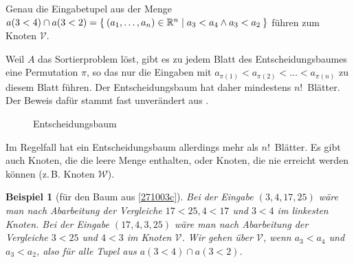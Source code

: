 \documentclass[ngerman,draft,parskip=half*,twoside]{scrreprt}
\theoremstyle{break}
\newtheorem{bsp}{Beispiel}[chapter]
\theoremstyle{nonumberbreak}
\newcommand*{\R}{\mathbb{R}}        %
\begin{document}
Genau die Eingabetupel aus der Menge $a(3<4)\cap
a(3<2)=\Set{(a_1,\ldots,a_{n})\in \R^n | a_3<a_4 \wedge a_3<a_2}$
führen zum Knoten $\mathcal{V}$.

Weil $A$ das Sortierproblem löst, gibt es zu jedem Blatt des
Entscheidungsbaumes eine Permutation $\pi$, so das nur die Eingaben
mit $a_{\pi(1)}<a_{\pi(2)}<\ldots<a_{\pi(n)}$ zu diesem Blatt
führen. Der Entscheidungsbaum hat daher mindestens $n!$~Blätter. Der
Beweis dafür stammt fast unverändert aus \cite{klein}.
 
%
\begin{figure}
 \centering
  \caption{Entscheidungsbaum}
  \label{271003c}
\end{figure}

Im Regelfall hat ein Entscheidungsbaum allerdings mehr 
als $n!$~Blätter. Es gibt auch Knoten, die die leere Menge enthalten,
oder Knoten, die nie erreicht werden können
(z.\,B. Knoten $\mathcal{W}$).
\begin{bsp}[für den Baum aus \autoref{271003c}]
  Bei der Eingabe $(3, 4, 17, 25)$ wäre man nach Abarbeitung der
  Vergleiche $17<25, 4<17$ und $3<4$ im linkesten Knoten.  Bei der
  Eingabe $(17, 4, 3, 25)$ wäre man nach Abarbeitung der Vergleiche
  $3<25$ und $4<3$ im Knoten $\mathcal{V}$.  Wir gehen über
  $\mathcal{V}$, wenn $a_3 < a_4$ und $a_3 < a_2 $, also für alle
  Tupel aus $ a(3<4) \cap a(3<2) $.  
\end{bsp}
\end{document}

